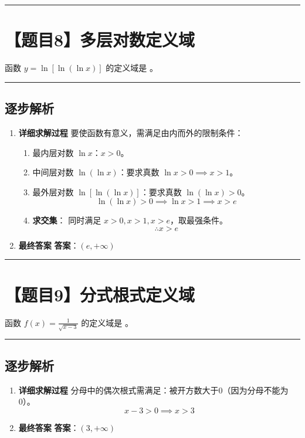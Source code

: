 \documentclass[UTF8]{ctexart}
\newenvironment{redenv}{\color{red}}{}
\newenvironment{detailedanalysis}{%
    \color{red}
    \begin{enumerate}[label=\textbf{第\arabic*步：}, leftmargin=*, align=left, itemsep=1.5ex]
}{%
    \end{enumerate}
}
\newcommand{\problemrule}{\noindent\rule{\textwidth}{1.5pt}\vspace{-0.8em}}
\newcommand{\analysisrule}{\noindent\rule{\textwidth}{0.8pt}\vspace{-0.8em}}
\newcommand{\blank}[1]{\underline{\hspace{#1}}}
\begin{document}
\problemrule
\section*{【题目8】多层对数定义域}
函数 $ y = \ln[\ln(\ln x)] $ 的定义域是 \blank{2cm}。

\begin{redenv}
\analysisrule
\subsection*{逐步解析}

\begin{detailedanalysis}
\item \textbf{详细求解过程}
要使函数有意义，需满足由内而外的限制条件：
\begin{enumerate}[label=(\arabic*)]
\item 最内层对数 $\ln x$：$x > 0$。
\item 中间层对数 $\ln(\ln x)$：要求真数 $\ln x > 0 \implies x > 1$。
\item 最外层对数 $\ln[\ln(\ln x)]$：要求真数 $\ln(\ln x) > 0$。
$$ \ln(\ln x) > 0 \implies \ln x > 1 \implies x > e $$
\item \textbf{求交集}：
同时满足 $x>0, x>1, x>e$，取最强条件。
$$ \therefore x > e $$
\end{enumerate}

\item \textbf{最终答案}
\textbf{答案}：$ (e, +\infty) $
\end{detailedanalysis}
\end{redenv}

\problemrule
\section*{【题目9】分式根式定义域}
函数 $ f(x)=\frac{1}{\sqrt{x-3}} $ 的定义域是 \blank{2cm}。

\begin{redenv}
\analysisrule
\subsection*{逐步解析}

\begin{detailedanalysis}
\item \textbf{详细求解过程}
分母中的偶次根式需满足：被开方数大于0（因为分母不能为0）。
$$ x - 3 > 0 \implies x > 3 $$

\item \textbf{最终答案}
\textbf{答案}：$ (3, +\infty) $
\end{detailedanalysis}
\end{redenv}
\end{document}
